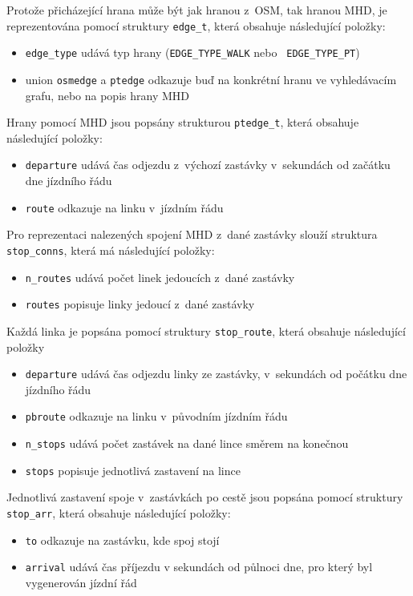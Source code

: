 Protože přicházející hrana může být jak hranou z~OSM, tak hranou MHD, je
reprezentována pomocí struktury {\tt edge\_t}, která obsahuje následující
položky:
\begin{itemize}
	\item {\tt edge\_type} udává typ hrany ({\tt EDGE\_TYPE\_WALK} nebo {\tt
	EDGE\_TYPE\_PT})
	\item union {\tt osmedge} a {\tt ptedge} odkazuje buď na konkrétní hranu
	ve vyhledávacím grafu, nebo na popis hrany MHD 
\end{itemize}
Hrany pomocí MHD jsou popsány strukturou {\tt ptedge\_t}, která obsahuje
následující položky: 
\begin{itemize}
	\item {\tt departure} udává čas odjezdu z~výchozí zastávky v~sekundách
	od začátku dne jízdního řádu
	\item {\tt route} odkazuje na linku v~jízdním řádu
\end{itemize}

Pro reprezentaci nalezených spojení MHD z~dané zastávky slouží struktura {\tt
stop\_conns}, která má následující položky:
\begin{itemize}
	\item {\tt n\_routes} udává počet linek jedoucích z~dané zastávky
	\item {\tt routes} popisuje linky jedoucí z~dané zastávky
\end{itemize}
Každá linka je popsána pomocí struktury {\tt stop\_route}, která obsahuje
následující položky 
\begin{itemize}
	\item {\tt departure} udává čas odjezdu linky ze zastávky, v~sekundách
	od počátku dne jízdního řádu 
	\item {\tt pbroute} odkazuje na linku v~původním jízdním řádu
	\item {\tt n\_stops} udává počet zastávek na dané lince směrem na
	konečnou
	\item {\tt stops} popisuje jednotlivá zastavení na lince
\end{itemize}
Jednotlivá zastavení spoje v~zastávkách po cestě jsou popsána pomocí struktury
{\tt stop\_arr}, která obsahuje následující položky:
\begin{itemize}
	\item {\tt to} odkazuje na zastávku, kde spoj stojí
	\item {\tt arrival} udává čas příjezdu v sekundách od půlnoci dne, pro
	který byl vygenerován jízdní řád
\end{itemize}
 
